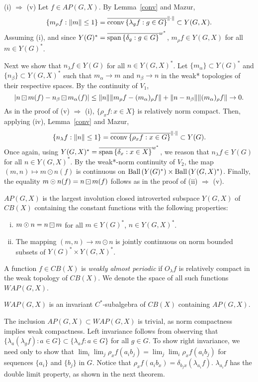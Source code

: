 (i) $\Rightarrow$ (v) Let $f\in AP(G,X)$.  By Lemma~\ref{conv} and Mazur,
\[
\{m_\rho f: \|m\| \leq 1\} = \overline{\operatorname{cconv\,}\{\lambda_g f: g\in G\}}^{\|\cdot\|} \subset Y(G,X).
\]
Assuming (i), and since $Y(G)^* = \overline{\operatorname{span\,}\{\delta_g: g\in G\}}^{w^*}$, $m_\rho f \in Y(G,X)$
for all $m\in Y(G)^*$.

Next we show that $n_\lambda f \in Y(G)$ for all $n\in Y(G,X)^*$.
Let $\{m_\alpha\}\subset Y(G)^*$ and $\{n_\beta\}\subset Y(G,X)^*$ such that $m_\alpha \rightarrow m$ and
$n_\beta \rightarrow n$ in the weak* topologies of their respective spaces.  By the continuity of $V_1$,
\[
|n\dotbox m(f) - n_\beta \dotbox m_\alpha (f)| \leq \|n\|\|m_\rho f - (m_\alpha)_\rho f\| + \|n-n_\beta\|\|(m_\alpha)_\rho f\| \rightarrow 0.
\]
As in the proof of (v) $\Rightarrow$ (i), $\{\rho_x f: x\in X\}$ is relatively norm compact.  Then, applying (iv),
Lemma~\ref{conv} and Mazur,
\[
\{n_\lambda f: \|n\|\leq 1\} = \overline{\operatorname{cconv\,}\{\rho_x f: x\in G\}}^{\|\cdot\|} \subset Y(G).
\]
Once again, using $Y(G,X)^* = \overline{\operatorname{span\,}\{\delta_x: x\in X\}}^{w^*}$, we reason that $n_\lambda f \in Y(G)$
for all $n\in Y(G,X)^*$.
By the weak*-norm continuity of $V_2$, the map $(m,n) \mapsto m\odot n(f)$
is continuous on $\operatorname{Ball\,}(Y(G)^*)\times\operatorname{Ball\,}(Y(G,X)^*)$.
Finally, the equality $m\odot n(f) = n\dotbox m(f)$ follows as in the proof of (ii) $\Rightarrow$ (v).
\done

\begin{corollary}
$AP(G,X)$ is the largest involution closed introverted subspace $Y(G,X)$ of $CB(X)$ containing the constant functions
with the following properties:
\begin{enumerate}[(i)]
\item $m\odot n = n\dotbox m$ for all $m\in Y(G)^*$, $n\in Y(G,X)^*$.
\item The mapping $(m,n) \rightarrow m\odot n$ is jointly continuous on norm bounded subsets of $Y(G)^* \times Y(G,X)^*$.
\end{enumerate}
\end{corollary}

\begin{defn}
A function $f\in CB(X)$ is {\it weakly almost periodic} 
if $O_\lambda f$ is relatively compact in the weak topology of $CB(X)$.  We
denote the space of all such functions $WAP(G,X)$.
\end{defn}

\begin{lemma}\label{sk4.2.3}
$WAP(G,X)$ is an invariant $C^*$-subalgebra of $CB(X)$ containing
$AP(G,X)$.
\end{lemma}
\proof
The inclusion $AP(G,X)\subset WAP(G,X)$ is trivial, as norm compactness implies weak compactness.
Left invariance follows from observing that $\{\lambda_a (\lambda_g f) : a\in G\} \subset \{\lambda_a f: a\in G\}$
for all $g\in G$.  To show right invariance, we need only to show that $\lim_i \lim_j \rho_x f(a_i b_j)
= \lim_j \lim_i \rho_x f(a_i b_j)$ for sequences $\{a_i\}$ and $\{b_j\}$ in $G$.  Notice that
$\rho_x f(a_i b_x) = \delta_{b_j x}(\lambda_{a_i}f)$.  $\lambda_{a_i}f$ has the double limit property,
as shown in the next theorem.

